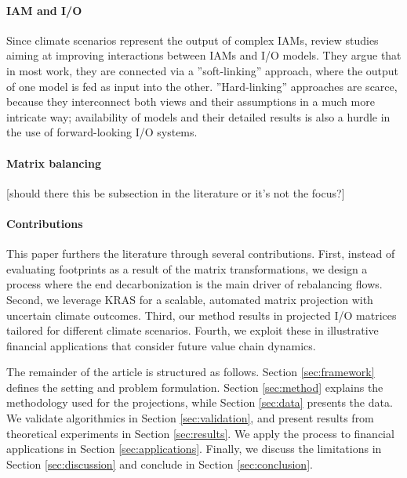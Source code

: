 \documentclass[11pt,a4paper]{article}
\begin{document}
\paragraph{IAM and I/O}
\label{sub:iam}
Since climate scenarios represent the output of complex IAMs, \citet{lefevre24} review studies aiming at improving interactions between IAMs and I/O models. They argue that in most work, they are connected via a ''soft-linking'' approach, where the output of one model is fed as input into the other. ''Hard-linking'' approaches are scarce, because they interconnect both views and their assumptions in a much more intricate way; availability of models and their detailed results is also a hurdle in the use of forward-looking I/O systems.

\paragraph{Matrix balancing}
\label{sub:balancing_lit}
[should there this be subsection in the literature or it's not the focus?]

\paragraph{Contributions}

This paper furthers the literature through several contributions. First, instead of evaluating footprints as a result of the matrix transformations, we design a process where the end decarbonization is the main driver of rebalancing flows. Second, we leverage KRAS for a scalable, automated matrix projection with uncertain climate outcomes. Third, our method results in projected I/O matrices tailored for different climate scenarios. Fourth, we exploit these in illustrative financial applications that consider future value chain dynamics.

The remainder of the article is structured as follows. Section \ref{sec:framework} defines the setting and problem formulation. Section \ref{sec:method} explains the methodology used for the projections, while Section \ref{sec:data} presents the data. We validate algorithmics in Section \ref{sec:validation}, and present results from theoretical experiments in Section \ref{sec:results}. We apply the process to financial applications in Section \ref{sec:applications}. Finally, we discuss the limitations in Section \ref{sec:discussion} and conclude in Section \ref{sec:conclusion}.
\end{document}
